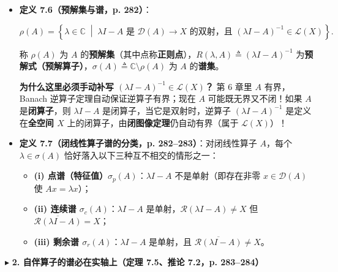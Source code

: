 \documentclass[11pt,a4paper]{article}
\providecommand{\tightlist}{\setlength{\itemsep}{1.8pt}\setlength{\parskip}{0pt}}
\newcommand{\SubSubHeading}[1]{%
  \Needspace{6.5\baselineskip}\vspace{5.5pt}\noindent
  \textcolor{AccentMain}{\scriptsize$\blacktriangleright$}\hspace{4pt}%
  {\small\bfseries\color{AccentMain}#1}\par\nopagebreak[4]\vspace{2.5pt}%
}
\renewenvironment{quote}{%
  \begin{tcolorbox}[
    enhanced,
    breakable,
    colback=AccentSoft!48!white,
    colframe=AccentMain,
    boxrule=0pt,
    leftrule=2.8pt,
    arc=2.5pt,
    left=9pt, right=8pt, top=6pt, bottom=6pt,
    before skip=5.5pt, after skip=5.5pt
  ]\small
}{%
  \end{tcolorbox}%
}
\newcommand{\FitDisplayMath}[1]{%
  \par\vspace{4pt}\noindent
  \begin{adjustbox}{max width=\linewidth, center}
    $\displaystyle #1$
  \end{adjustbox}
  \par\vspace{4pt}%
}
\begin{document}
\begin{itemize}
\item
  \textbf{定义 7.6（预解集与谱，p. 282）}： 
\FitDisplayMath{\rho(A) = \left\{\lambda \in \mathbb{C} \;\middle|\; \lambda I - A \text{ 是 } \mathcal{D}(A) \to X \text{ 的双射，且 } (\lambda I - A)^{-1} \in \mathcal{L}(X)\right\}.}
 称 \(\rho(A)\) 为 \(A\) 的\textbf{预解集}（其中点称\textbf{正则点}），\(R(\lambda, A) \triangleq (\lambda I - A)^{-1}\) 为\textbf{预解式（预解算子）}，\(\sigma(A) \triangleq \mathbb{C} \setminus \rho(A)\) 为 \(A\) 的\textbf{谱集}。

  \begin{quote}
  \textbf{为什么这里必须手动补写 \((\lambda I - A)^{-1} \in \mathcal{L}(X)\)？} 第 6 章里 \(A\) 有界，Banach 逆算子定理自动保证逆算子有界；现在 \(A\) 可能既无界又不闭！如果 \(A\) 是\textbf{闭算子}，则 \(\lambda I - A\) 是闭算子，当它是双射时，逆算子 \((\lambda I - A)^{-1}\) 是定义在\textbf{全空间 \(X\)} 上的闭算子，由\textbf{闭图像定理}仍自动有界（属于 \(\mathcal{L}(X)\)）！
  \end{quote}
\item
  \textbf{定义 7.7（闭线性算子谱的分类，p. 282--283）}：对闭线性算子 \(A\)，每个 \(\lambda \in \sigma(A)\) 恰好落入以下三种互不相交的情形之一：

  \begin{itemize}
  \tightlist
  \item
    \textbf{(i) 点谱（特征值）\(\sigma_p(A)\)}：\(\lambda I - A\) 不是单射（即存在非零 \(x \in \mathcal{D}(A)\) 使 \(Ax = \lambda x\)）；
  \item
    \textbf{(ii) 连续谱 \(\sigma_c(A)\)}：\(\lambda I - A\) 是单射，\(\mathcal{R}(\lambda I - A) \neq X\) 但 \(\overline{\mathcal{R}(\lambda I - A)} = X\)；
  \item
    \textbf{(iii) 剩余谱 \(\sigma_r(A)\)}：\(\lambda I - A\) 是单射，且 \(\overline{\mathcal{R}(\lambda I - A)} \neq X\)。
  \end{itemize}
\end{itemize}

\SubSubHeading{2. 自伴算子的谱必在实轴上（定理 7.5、推论 7.2，p. 283--284）}
\end{document}
